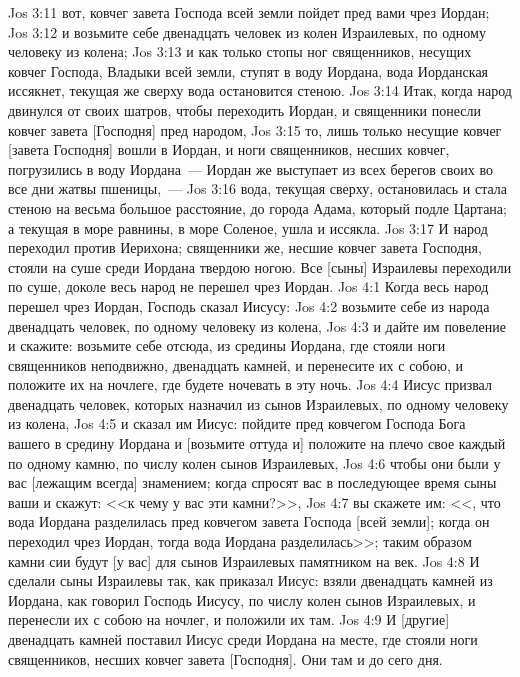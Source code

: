 \vs Jos 3:11 вот, ковчег завета Господа всей земли пойдет пред вами чрез Иордан;
\vs Jos 3:12 и возьмите себе двенадцать человек из колен Израилевых, по одному человеку из колена;
\vs Jos 3:13 и как только стопы ног священников, несущих ковчег Господа, Владыки всей земли, ступят в воду Иордана, вода Иорданская иссякнет, текущая же сверху вода остановится стеною.
\vs Jos 3:14 Итак, когда народ двинулся от своих шатров, чтобы переходить Иордан, и священники понесли ковчег завета [Господня] пред народом,
\vs Jos 3:15 то, лишь только несущие ковчег [завета Господня] вошли в Иордан, и ноги священников, несших ковчег, погрузились в воду Иордана~--- Иордан же выступает из всех берегов своих во все дни жатвы пшеницы,~---
\vs Jos 3:16 вода, текущая сверху, остановилась и стала стеною на весьма большое расстояние, до города Адама, который подле Цартана; а текущая в море равнины, в море Соленое, ушла и иссякла.
\vs Jos 3:17 И народ переходил против Иерихона; священники же, несшие ковчег завета Господня, стояли на суше среди Иордана твердою ногою. Все [сыны] Израилевы переходили по суше, доколе весь народ не перешел чрез Иордан.
\vs Jos 4:1 Когда весь народ перешел чрез Иордан, Господь сказал Иисусу:
\vs Jos 4:2 возьмите себе из народа двенадцать человек, по одному человеку из колена,
\vs Jos 4:3 и дайте им повеление и скажите: возьмите себе отсюда, из средины Иордана, где стояли ноги священников неподвижно, двенадцать камней, и перенесите их с собою, и положите их на ночлеге, где будете ночевать в эту ночь.
\vs Jos 4:4 Иисус призвал двенадцать человек, которых назначил из сынов Израилевых, по одному человеку из колена,
\vs Jos 4:5 и сказал им Иисус: пойдите пред ковчегом Господа Бога вашего в средину Иордана и [возьмите оттуда и] положите на плечо свое каждый по одному камню, по числу колен сынов Израилевых,
\vs Jos 4:6 чтобы они были у вас [лежащим всегда] знамением; когда спросят вас в последующее время сыны ваши и скажут: <<к чему у вас эти камни?>>,
\vs Jos 4:7 вы скажете им: <<, что вода Иордана разделилась пред ковчегом завета Господа [всей земли]; когда он переходил чрез Иордан, тогда вода Иордана разделилась>>; таким образом камни сии будут [у вас] для сынов Израилевых памятником на век.
\vs Jos 4:8 И сделали сыны Израилевы так, как приказал Иисус: взяли двенадцать камней из Иордана, как говорил Господь Иисусу, по числу колен сынов Израилевых, и перенесли их с собою на ночлег, и положили их там.
\vs Jos 4:9 И [другие] двенадцать камней поставил Иисус среди Иордана на месте, где стояли ноги священников, несших ковчег завета [Господня]. Они там и до сего дня.
